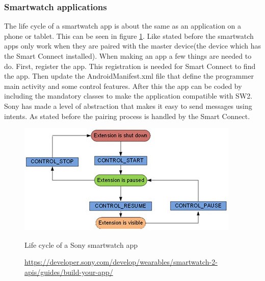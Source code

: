 \subsubsection{Smartwatch applications}
\label{subsubsec:sw_app}
The life cycle of a smartwatch app is about the same as an application on a phone or tablet. This can be seen in figure \ref{fig:sw2_lifecycle}. Like stated before the smartwatch apps only work when they are paired with the master device(the device which has the Smart Connect installed). When making an app a few things are needed to do. First, register the app. This registration is needed for Smart Connect to find the app. \pend
Then update the AndroidManifest.xml file that define the programmer main activity and some control features. After this the app can be coded by including the mandatory classes to make the application compatible with SW2. \pend  
Sony has made a level of abstraction that makes it easy to send messages using intents. As stated before the pairing process is handled by the Smart Connect. 
\begin{figure}
\begin{center}
\includegraphics[scale=0.5]{images/applifecycle.jpg}
\end{center}
  \caption{Life cycle of a Sony smartwatch app}
  \label{fig:sw2_lifecycle}
  \caption*{\url{https://developer.sony.com/develop/wearables/smartwatch-2-apis/guides/build-your-app/}}
\end{figure}